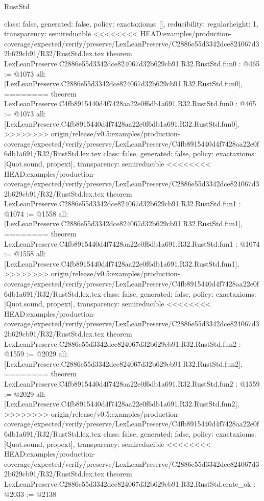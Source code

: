\begin{lexlean}{RustStd}
\begin{coremodule}
{\begin{coremodule}
{{{  class: false,
  generated: false,
  policy: exact{axioms: []},
  reducibility: regular{height: 1},
  transparency: semireducible
}
<<<<<<<< HEAD:examples/production-coverage/expected/verify/preserve/LexLeanPreserve/C2886e55d3342dce824067d32b629cb91/R32/RustStd.lex.tex
theorem LexLeanPreserve.C2886e55d3342dce824067d32b629cb91.R32.RustStd.fun0 : @465 := @1073 {
  all: [LexLeanPreserve.C2886e55d3342dce824067d32b629cb91.R32.RustStd.fun0],
========
theorem LexLeanPreserve.C4fb8915440d4f7428aa22e0f6db1a691.R32.RustStd.fun0 : @465 := @1073 {
  all: [LexLeanPreserve.C4fb8915440d4f7428aa22e0f6db1a691.R32.RustStd.fun0],
>>>>>>>> origin/release/v0.5:examples/production-coverage/expected/verify/preserve/LexLeanPreserve/C4fb8915440d4f7428aa22e0f6db1a691/R32/RustStd.lex.tex
  class: false,
  generated: false,
  policy: exact{axioms: [Quot.sound, propext]},
  transparency: semireducible
}
<<<<<<<< HEAD:examples/production-coverage/expected/verify/preserve/LexLeanPreserve/C2886e55d3342dce824067d32b629cb91/R32/RustStd.lex.tex
theorem LexLeanPreserve.C2886e55d3342dce824067d32b629cb91.R32.RustStd.fun1 : @1074 := @1558 {
  all: [LexLeanPreserve.C2886e55d3342dce824067d32b629cb91.R32.RustStd.fun1],
========
theorem LexLeanPreserve.C4fb8915440d4f7428aa22e0f6db1a691.R32.RustStd.fun1 : @1074 := @1558 {
  all: [LexLeanPreserve.C4fb8915440d4f7428aa22e0f6db1a691.R32.RustStd.fun1],
>>>>>>>> origin/release/v0.5:examples/production-coverage/expected/verify/preserve/LexLeanPreserve/C4fb8915440d4f7428aa22e0f6db1a691/R32/RustStd.lex.tex
  class: false,
  generated: false,
  policy: exact{axioms: [Quot.sound, propext]},
  transparency: semireducible
}
<<<<<<<< HEAD:examples/production-coverage/expected/verify/preserve/LexLeanPreserve/C2886e55d3342dce824067d32b629cb91/R32/RustStd.lex.tex
theorem LexLeanPreserve.C2886e55d3342dce824067d32b629cb91.R32.RustStd.fun2 : @1559 := @2029 {
  all: [LexLeanPreserve.C2886e55d3342dce824067d32b629cb91.R32.RustStd.fun2],
========
theorem LexLeanPreserve.C4fb8915440d4f7428aa22e0f6db1a691.R32.RustStd.fun2 : @1559 := @2029 {
  all: [LexLeanPreserve.C4fb8915440d4f7428aa22e0f6db1a691.R32.RustStd.fun2],
>>>>>>>> origin/release/v0.5:examples/production-coverage/expected/verify/preserve/LexLeanPreserve/C4fb8915440d4f7428aa22e0f6db1a691/R32/RustStd.lex.tex
  class: false,
  generated: false,
  policy: exact{axioms: [Quot.sound, propext]},
  transparency: semireducible
}
<<<<<<<< HEAD:examples/production-coverage/expected/verify/preserve/LexLeanPreserve/C2886e55d3342dce824067d32b629cb91/R32/RustStd.lex.tex
theorem LexLeanPreserve.C2886e55d3342dce824067d32b629cb91.R32.RustStd.crate_ok : @2033 := @2138 {
}}}}}}
\end{coremodule}}
\end{coremodule}
\end{lexlean}
